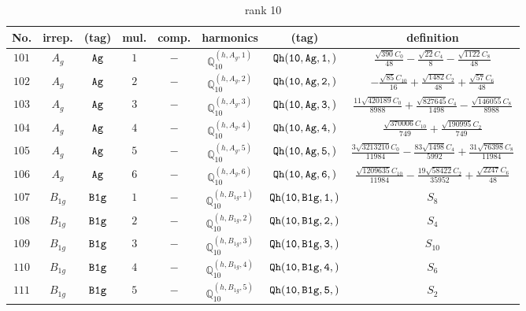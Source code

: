 \documentclass[fleqn,8pt]{jsarticle}
\begin{document}
\begin{table}[ht!]
\begin{center}
\caption{rank 10}
\renewcommand{\arraystretch}{1.3}
\begin{tabular}{cccccccc} \hline \hline
No. & irrep. & (tag) & mul. & comp. & harmonics & (tag) & definition \\ \hline
$ 101 $ & $ A_{g} $ & $ {\tt Ag} $ & $ 1 $ & $ - $ & $ \mathbb{Q}_{10}^{(h,A_{g},1)} $ & $ {\tt Qh(10,Ag,1,)} $ & $ \frac{\sqrt{390} C_{0}}{48} - \frac{\sqrt{22} C_{4}}{8} - \frac{\sqrt{1122} C_{8}}{48} $ \\
$ 102 $ & $ A_{g} $ & $ {\tt Ag} $ & $ 2 $ & $ - $ & $ \mathbb{Q}_{10}^{(h,A_{g},2)} $ & $ {\tt Qh(10,Ag,2,)} $ & $ - \frac{\sqrt{85} C_{10}}{16} + \frac{\sqrt{1482} C_{2}}{48} + \frac{\sqrt{57} C_{6}}{48} $ \\
$ 103 $ & $ A_{g} $ & $ {\tt Ag} $ & $ 3 $ & $ - $ & $ \mathbb{Q}_{10}^{(h,A_{g},3)} $ & $ {\tt Qh(10,Ag,3,)} $ & $ \frac{11 \sqrt{420189} C_{0}}{8988} + \frac{\sqrt{827645} C_{4}}{1498} - \frac{\sqrt{146055} C_{8}}{8988} $ \\
$ 104 $ & $ A_{g} $ & $ {\tt Ag} $ & $ 4 $ & $ - $ & $ \mathbb{Q}_{10}^{(h,A_{g},4)} $ & $ {\tt Qh(10,Ag,4,)} $ & $ \frac{\sqrt{370006} C_{10}}{749} + \frac{\sqrt{190995} C_{2}}{749} $ \\
$ 105 $ & $ A_{g} $ & $ {\tt Ag} $ & $ 5 $ & $ - $ & $ \mathbb{Q}_{10}^{(h,A_{g},5)} $ & $ {\tt Qh(10,Ag,5,)} $ & $ \frac{3 \sqrt{3213210} C_{0}}{11984} - \frac{83 \sqrt{1498} C_{4}}{5992} + \frac{31 \sqrt{76398} C_{8}}{11984} $ \\
$ 106 $ & $ A_{g} $ & $ {\tt Ag} $ & $ 6 $ & $ - $ & $ \mathbb{Q}_{10}^{(h,A_{g},6)} $ & $ {\tt Qh(10,Ag,6,)} $ & $ \frac{\sqrt{1209635} C_{10}}{11984} - \frac{19 \sqrt{58422} C_{2}}{35952} + \frac{\sqrt{2247} C_{6}}{48} $ \\
$ 107 $ & $ B_{1g} $ & $ {\tt B1g} $ & $ 1 $ & $ - $ & $ \mathbb{Q}_{10}^{(h,B_{1g},1)} $ & $ {\tt Qh(10,B1g,1,)} $ & $ S_{8} $ \\
$ 108 $ & $ B_{1g} $ & $ {\tt B1g} $ & $ 2 $ & $ - $ & $ \mathbb{Q}_{10}^{(h,B_{1g},2)} $ & $ {\tt Qh(10,B1g,2,)} $ & $ S_{4} $ \\
$ 109 $ & $ B_{1g} $ & $ {\tt B1g} $ & $ 3 $ & $ - $ & $ \mathbb{Q}_{10}^{(h,B_{1g},3)} $ & $ {\tt Qh(10,B1g,3,)} $ & $ S_{10} $ \\
$ 110 $ & $ B_{1g} $ & $ {\tt B1g} $ & $ 4 $ & $ - $ & $ \mathbb{Q}_{10}^{(h,B_{1g},4)} $ & $ {\tt Qh(10,B1g,4,)} $ & $ S_{6} $ \\
$ 111 $ & $ B_{1g} $ & $ {\tt B1g} $ & $ 5 $ & $ - $ & $ \mathbb{Q}_{10}^{(h,B_{1g},5)} $ & $ {\tt Qh(10,B1g,5,)} $ & $ S_{2} $ \\

\end{tabular}
\end{center}
\end{table}
\end{document}
